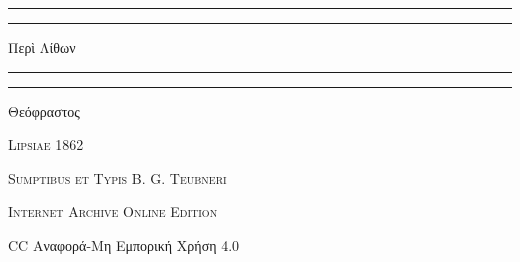 \documentclass[a4paper, 11pt, oneside, polutonikogreek, german]{article}
\begin{document}
\begin{titlepage} %
	\centering %


	\rule{\textwidth}{1.6pt}\vspace*{-\baselineskip}\vspace*{2pt} %
	\rule{\textwidth}{0.4pt} %
	
	\vspace{1\baselineskip} %
	
	{\Huge Περὶ Λίθων}
	
	\vspace{1\baselineskip} %

	\rule{\textwidth}{0.4pt}\vspace*{-\baselineskip}\vspace{3.2pt} %
	\rule{\textwidth}{1.6pt} %
	
	\vspace{1\baselineskip} %
	
	
	{\Large Θεόφραστος}
 
        \vspace{0.5\baselineskip}
	
	\vspace*{1\baselineskip} %
	
        {\scshape \normalsize } %

        \vspace*{\fill}    

	\vspace{1\baselineskip}

	{\small\scshape Lipsiae 1862}
	
	{\small\scshape{Sumptibus et Typis B. G. Teubneri}}
	
	\vspace{0.5\baselineskip} %

        {\scshape Internet Archive Online Edition}%
    
	{\small CC Αναφορά-Μη Εμπορική Χρήση 4.0} %
\end{titlepage}
\end{document}
